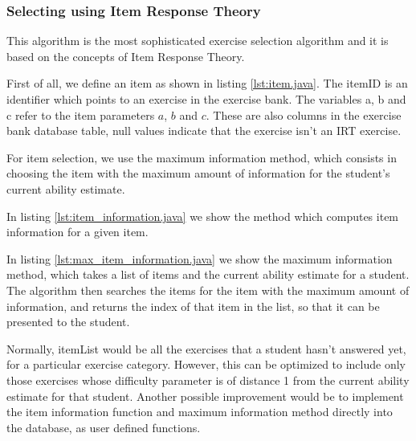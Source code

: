 \subsubsection{Selecting using Item Response Theory}
This algorithm is the most sophisticated exercise selection algorithm and it is based on the concepts of Item Response Theory. \newline



First of all, we define an item as shown in listing \ref{lst:item.java}. The \textsf{itemID} is an identifier which points to an exercise in the exercise bank. The variables \textsf{a}, \textsf{b} and \textsf{c} refer to the item parameters $a$, $b$ and $c$. These are also columns in the exercise bank database table, null values indicate that the exercise isn't an IRT exercise. \newline

For item selection, we use the maximum information method, which consists in choosing the item with the maximum amount of information for the student's current ability estimate. \newline



In listing \ref{lst:item_information.java} we show the method which computes item information for a given item.



In listing \ref{lst:max_item_information.java} we show the maximum information method, which takes a list of items and the current ability estimate for a student. The algorithm then searches the items for the item with the maximum amount of information, and returns the index of that item in the list, so that it can be presented to the student. \newline

Normally, \textsf{itemList} would be all the exercises that a student hasn't answered yet, for a particular exercise category. However, this can be optimized to include only those exercises whose difficulty parameter is of distance 1 from the current ability estimate for that student. Another possible improvement would be to implement the item information function and maximum information method directly into the database, as user defined functions.\newline

